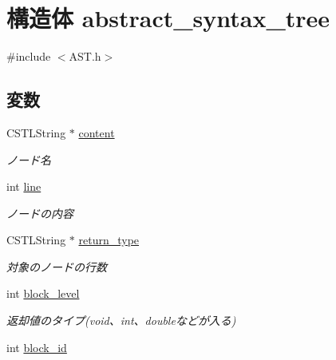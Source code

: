 \section{構造体 abstract\_\-syntax\_\-tree}
\label{structabstract__syntax__tree}


{\ttfamily \#include $<$AST.h$>$}

\subsection*{変数}
\begin{DoxyCompactItemize}
\item 
CSTLString $\ast$ \hyperlink{structabstract__syntax__tree_a1d3ebb923055b39ec93220a82010c9a5}{content}\label{structabstract__syntax__tree_a1d3ebb923055b39ec93220a82010c9a5}

\begin{DoxyCompactList}\small\item\em ノード名 \item\end{DoxyCompactList}\item 
int \hyperlink{structabstract__syntax__tree_a16de2988d91f99ee9324a8e27e59314a}{line}\label{structabstract__syntax__tree_a16de2988d91f99ee9324a8e27e59314a}

\begin{DoxyCompactList}\small\item\em ノードの内容 \item\end{DoxyCompactList}\item 
CSTLString $\ast$ \hyperlink{structabstract__syntax__tree_a427a4655976ce8284a3197e9d9a9b856}{return\_\-type}\label{structabstract__syntax__tree_a427a4655976ce8284a3197e9d9a9b856}

\begin{DoxyCompactList}\small\item\em 対象のノードの行数 \item\end{DoxyCompactList}\item 
int \hyperlink{structabstract__syntax__tree_a9da95b72b69ccebafe64a6cdff6735b1}{block\_\-level}\label{structabstract__syntax__tree_a9da95b72b69ccebafe64a6cdff6735b1}

\begin{DoxyCompactList}\small\item\em 返却値のタイプ(void、int、doubleなどが入る) \item\end{DoxyCompactList}\item 
int \hyperlink{structabstract__syntax__tree_a1130545fa7b86f9006c3b68b0943a33a}{block\_\-id}\label{structabstract__syntax__tree_a1130545fa7b86f9006c3b68b0943a33a}


\end{DoxyCompactItemize}
